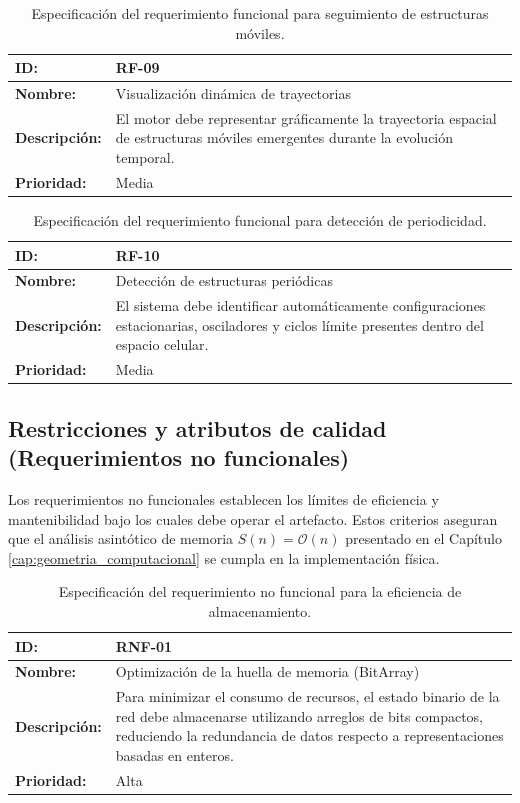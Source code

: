 \begin{table}[H]
\centering
\begin{tabular}{|l|p{10cm}|}
\hline
\textbf{ID:} & \textbf{RF-09} \\ \hline
\textbf{Nombre:} & Visualización dinámica de trayectorias \\ \hline
\textbf{Descripción:} & El motor debe representar gráficamente la trayectoria espacial de estructuras móviles emergentes durante la evolución temporal. \\ \hline
\textbf{Prioridad:} & Media \\ \hline
\end{tabular}
\caption{Especificación del requerimiento funcional para seguimiento de estructuras móviles.}
\label{tab:rf09}
\end{table}

\begin{table}[H]
\centering
\begin{tabular}{|l|p{10cm}|}
\hline
\textbf{ID:} & \textbf{RF-10} \\ \hline
\textbf{Nombre:} & Detección de estructuras periódicas \\ \hline
\textbf{Descripción:} & El sistema debe identificar automáticamente configuraciones estacionarias, osciladores y ciclos límite presentes dentro del espacio celular. \\ \hline
\textbf{Prioridad:} & Media \\ \hline
\end{tabular}
\caption{Especificación del requerimiento funcional para detección de periodicidad.}
\label{tab:rf10}
\end{table}


\subsection{Restricciones y atributos de calidad (Requerimientos no funcionales)}

Los requerimientos no funcionales establecen los límites de eficiencia y mantenibilidad bajo los cuales debe operar el artefacto. Estos criterios aseguran que el análisis asintótico de memoria $S(n) = \mathcal{O}(n)$ presentado en el Capítulo \ref{cap:geometria_computacional} se cumpla en la implementación física.

\begin{table}[ht]
\centering
\begin{tabular}{|l|p{10cm}|}
\hline
\textbf{ID:} & \textbf{RNF-01} \\ \hline
\textbf{Nombre:} & Optimización de la huella de memoria (BitArray) \\ \hline
\textbf{Descripción:} & Para minimizar el consumo de recursos, el estado binario de la red debe almacenarse utilizando arreglos de bits compactos, reduciendo la redundancia de datos respecto a representaciones basadas en enteros. \\ \hline
\textbf{Prioridad:} & Alta \\ \hline
\end{tabular}
\caption{Especificación del requerimiento no funcional para la eficiencia de almacenamiento.}
\label{tab:rnf01}
\end{table}

